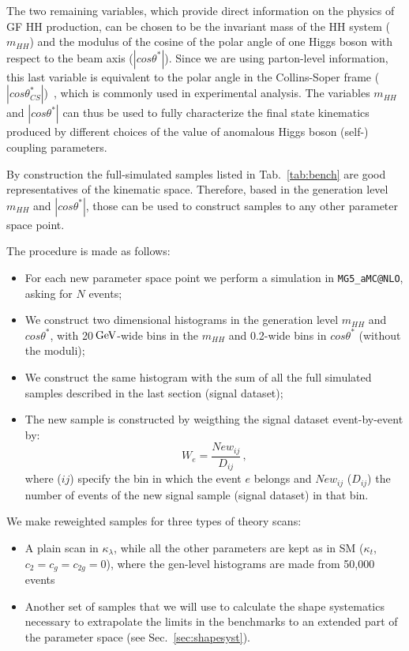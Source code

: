 The two remaining variables, which provide direct information on the physics of GF HH production, can be chosen to be the invariant mass of the HH system ($m_{HH}$) and the modulus of the cosine of the  polar angle of one Higgs boson with respect to the beam axis ($|cos\theta^*|$). Since we are using parton-level information, this last variable is equivalent to the polar angle in the Collins-Soper frame ($|cos\theta^*_{CS}|$)~\cite{PhysRevD.16.2219}, which is commonly used in experimental analysis. The variables $m_{HH}$ and $|cos\theta^*|$ can thus be used to fully characterize the final state kinematics produced by different choices of the value of anomalous Higgs boson (self-) coupling parameters.

By construction the full-simulated samples listed in Tab.~\ref{tab:bench}  are good representatives of the kinematic space. 
Therefore, based in the generation level $m_{HH}$ and $|cos\theta^*|$, those can be used to construct 
samples to any other parameter space point. 

The procedure is made as follows: 
\begin{itemize}
\item For each new parameter space point we perform 
a simulation in {\tt MG5\_aMC@NLO}, asking for $N$ events;
\item We construct two dimensional histograms in the 
generation level $m_{HH}$ and $cos\theta^*$, with 20$\,\text{Ge\hspace{-.08em}V}$-wide bins in the $m_{HH}$ and
 0.2-wide bins in $cos\theta^*$ (without the moduli);
\item We construct the same histogram with the sum of all the full simulated samples described in the last section (signal dataset);
\item The new sample is constructed by weigthing the signal dataset event-by-event by:
 \begin{equation}
 W_{e} = \frac{New_{ij}}{D_{ij}}\,,
 \end{equation}
 where ($ij$) specify the bin in which the event $e$ belongs and $New_{ij}$ ($D_{ij}$) the number of events of the 
 new signal sample (signal dataset) in that bin. 
 \end{itemize}
 
 We make reweighted samples for three types of theory scans:
\begin{itemize}
  \item A plain scan in $\kappa_{\lambda}$, while all the other parameters are kept as in SM ($\kappa_{t}$, $c_2 = c_g  = c_{2g} =0$), where the gen-level histograms are made from 50,000 events
  \item Another set of samples that we will use to calculate the shape systematics necessary to extrapolate the limits in the benchmarks to an extended part of the parameter space (see Sec.~\ref{sec:shapesyst}).
\end{itemize} 
 
